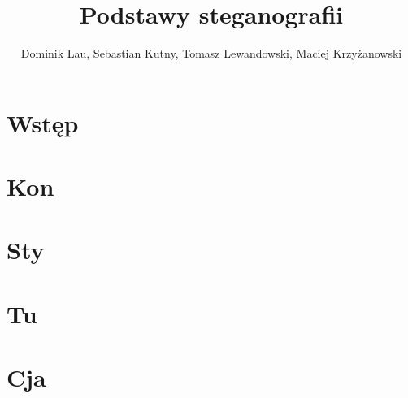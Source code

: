 \documentclass{article}
\title{Podstawy steganografii}
\author{Dominik Lau, Sebastian Kutny, Tomasz Lewandowski, Maciej Krzyżanowski}
\begin{document}
\maketitle
\section{Wstęp}
\section{Kon}
\section{Sty}
\section{Tu}
\section{Cja}
\end{document}
